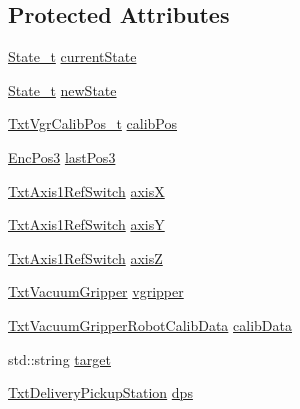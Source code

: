 \subsection*{Protected Attributes}
\begin{DoxyCompactItemize}
\item 
\hyperlink{classft_1_1_txt_vacuum_gripper_robot_a44b86628599c6f40dd9f709fef647211}{State\+\_\+t} \hyperlink{classft_1_1_txt_vacuum_gripper_robot_a521c5c6261040a62ce153f138739f3e8}{current\+State}
\item 
\hyperlink{classft_1_1_txt_vacuum_gripper_robot_a44b86628599c6f40dd9f709fef647211}{State\+\_\+t} \hyperlink{classft_1_1_txt_vacuum_gripper_robot_a9ec07699b78bd3f5413378c4ff6cd05c}{new\+State}
\item 
\hyperlink{namespaceft_aee2adb2339d398fc7ed033c80030e685}{Txt\+Vgr\+Calib\+Pos\+\_\+t} \hyperlink{classft_1_1_txt_vacuum_gripper_robot_aeebcec5e3d4bb15ac86bb7ff3f1ac96e}{calib\+Pos}
\item 
\hyperlink{classft_1_1_enc_pos3}{Enc\+Pos3} \hyperlink{classft_1_1_txt_vacuum_gripper_robot_a1e2b42d76cec76bd1339aa54b85c5a0f}{last\+Pos3}
\item 
\hyperlink{classft_1_1_txt_axis1_ref_switch}{Txt\+Axis1\+Ref\+Switch} \hyperlink{classft_1_1_txt_vacuum_gripper_robot_a1588685e15a03b16b07686e2e4c3f746}{axisX}
\item 
\hyperlink{classft_1_1_txt_axis1_ref_switch}{Txt\+Axis1\+Ref\+Switch} \hyperlink{classft_1_1_txt_vacuum_gripper_robot_a4e847424958606a0c0f8eea691ffca3a}{axisY}
\item 
\hyperlink{classft_1_1_txt_axis1_ref_switch}{Txt\+Axis1\+Ref\+Switch} \hyperlink{classft_1_1_txt_vacuum_gripper_robot_a185a2e7cb044495f936bd34e1077ab1a}{axisZ}
\item 
\hyperlink{classft_1_1_txt_vacuum_gripper}{Txt\+Vacuum\+Gripper} \hyperlink{classft_1_1_txt_vacuum_gripper_robot_a70ee7a25a6cd4a3d108fa044e483f464}{vgripper}
\item 
\hyperlink{classft_1_1_txt_vacuum_gripper_robot_calib_data}{Txt\+Vacuum\+Gripper\+Robot\+Calib\+Data} \hyperlink{classft_1_1_txt_vacuum_gripper_robot_ad9e8506065dc76e5bf2c84cbe4b616be}{calib\+Data}
\item 
std\+::string \hyperlink{classft_1_1_txt_vacuum_gripper_robot_a9ded37d075da735719cc8ee655a69047}{target}
\item 
\hyperlink{classft_1_1_txt_delivery_pickup_station}{Txt\+Delivery\+Pickup\+Station} \hyperlink{classft_1_1_txt_vacuum_gripper_robot_a4b09d876d25c12acd8cb60d36f397886}{dps}

\end{DoxyCompactItemize}
